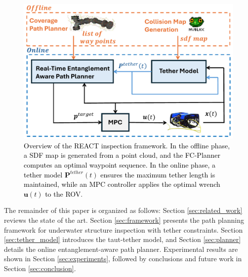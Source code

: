 %
\begin{figure}[t!]
	\centering	\includegraphics[width=1\linewidth]{EA-Planner/figures/react_abstract.pdf}
	  \caption{\textcolor{black}{Overview of the \ac{REACT} inspection framework. In the offline phase, a \ac{SDF} map is generated from a point cloud, and the FC-Planner \cite{feng2024fc} computes an optimal waypoint sequence. In the online phase, a tether model $\mathbf{P}^{tether}(t)$ ensures the maximum tether length is maintained, while an \ac{MPC} controller applies the optimal wrench $\mathbf{u}(t)$ to the \ac{ROV}}.}
    \label{fig:abstract}
\end{figure}
%







The remainder of this paper is organized as follows: Section \ref{sec:related_work} reviews the state of the art. Section \ref{sec:framework} presents the path planning framework for underwater structure inspection with tether constraints. Section \ref{sec:tether_model} introduces the taut-tether model, and Section \ref{sec:planner} details the online entanglement-aware path planner. Experimental results are shown in Section \ref{sec:experiments}, followed by conclusions and future work in Section \ref{sec:conclusion}.





